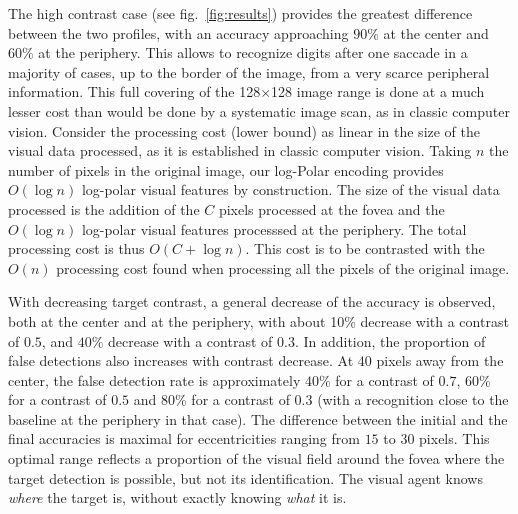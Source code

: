 
The high contrast case (see fig.~\ref{fig:results}) provides the greatest difference between the two profiles, with an accuracy approaching $90\%$ at the center and $60\%$ at the periphery. This allows to recognize digits after one saccade in a majority of cases, up to the border of the image, from a very scarce peripheral information. This full covering of the 128$\times$128 image range is done at a much lesser cost than would be done by a systematic image scan, as in classic computer vision.
Consider the processing cost (lower bound) as linear in the size of the visual data processed, as it is established in classic computer vision. Taking $n$ the number of pixels in the original image, our log-Polar encoding provides $O(\log n)$ log-polar visual features by construction. The size of the visual data processed is the addition of the $C$ pixels processed at the fovea and the $O(\log n)$ log-polar visual features processsed at the periphery. The total processing cost is thus $O(C+\log n)$. This cost is to be contrasted with the $O(n)$ processing cost found when processing all the pixels of the original image.

With decreasing target contrast, a general decrease of the accuracy is observed, both at the center and at the periphery, with about 10\% decrease with a contrast of $0.5$, and $40\%$ decrease with a contrast of $0.3$. In addition, the proportion of false detections also increases with contrast decrease. At $40$ pixels away from the center, the false detection rate is approximately $40\%$ for a contrast of $0.7$, $60\%$ for a contrast of $0.5$ and $80\%$ for a contrast of $0.3$ (with a recognition close to the baseline at the periphery in that case). The difference between the initial and the final accuracies is maximal for eccentricities ranging from $15$ to $30$ pixels. This optimal range reflects a proportion of the visual field around the fovea where the target detection is possible, but not its identification. The visual agent knows \emph{where} the target is, without exactly knowing \emph{what} it is.





